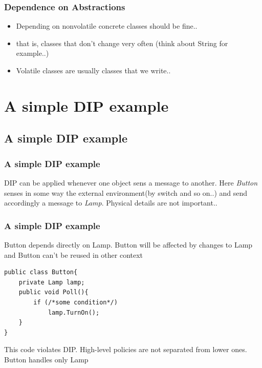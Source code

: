 \documentclass{beamer}
\begin{document}
\begin{frame}
  \frametitle{Dependence on Abstractions}
  \begin{itemize}
	\item<+-> Depending on nonvolatile concrete classes should be fine..
	\item<+-> that is, classes that don't change very often (think about String for example..)
	\item<+-> Volatile classes are usually classes that we write..
  \end{itemize}
\end{frame}

\section{A simple DIP example}
\subsection{A simple DIP example}
\begin{frame}
	\frametitle{A simple DIP example}
	DIP can be applied whenever one object sens a message to another. Here \textit{Button} senses in some way the external environment(by switch and so on..) and send accordingly a message to \textit{Lamp}. Physical details are not important..
	\begin{center}
	\end{center}
\end{frame}

\begin{frame}[containsverbatim]
	\frametitle{A simple DIP example}
	Button depends directly on Lamp. Button will be affected by changes to Lamp and Button can't be reused in other context \\
	\begin{lstlisting}
public class Button{
	private Lamp lamp;
	public void Poll(){
		if (/*some condition*/)
			lamp.TurnOn();
	}
}
	\end{lstlisting}
	This code violates DIP. High-level policies are not separated from lower ones. Button handles only Lamp
\end{frame}
\end{document}
